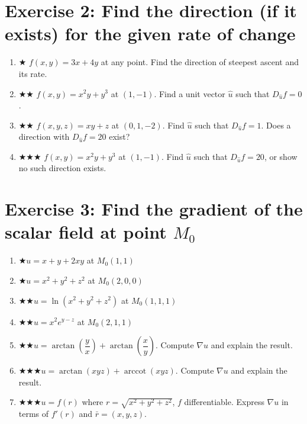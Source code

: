 \documentclass[12pt,a4paper]{article}
\newcommand{\easy}{{\color{green!60!black}$\bigstar$}}
\newcommand{\medium}{{\color{orange}$\bigstar\bigstar$}}
\newcommand{\hard}{{\color{red}$\bigstar\bigstar\bigstar$}}
\begin{document}
\section*{Exercise 2: Find the direction (if it exists) for the given rate of change}

\begin{enumerate}[leftmargin=*, label=(\alph*)]

\item \easy\quad
$f(x,y) = 3x + 4y$ at any point. Find the direction of steepest ascent and its rate.

\item \medium\quad
$f(x,y) = x^2 y + y^3$ at $(1,-1)$.
Find a unit vector $\hat{u}$ such that $D_{\hat{u}}f = 0$.

\item \medium\quad
$f(x,y,z) = xy+z$ at $(0,1,-2)$.
Find $\hat{u}$ such that $D_{\hat{u}}f = 1$.
Does a direction with $D_{\hat{u}}f = 20$ exist?

\item \hard\quad
$f(x,y) = x^2 y + y^3$ at $(1,-1)$.
Find $\hat{u}$ such that $D_{\hat{u}}f = 20$, or show no such direction exists.

\end{enumerate}

\section*{Exercise 3: Find the gradient of the scalar field at point $M_0$}

\begin{enumerate}[leftmargin=*, label=(\alph*)]
\item \easy\quad $u = x+y+2xy$ at $M_0(1,1)$
\item \easy\quad $u = x^2+y^2+z^2$ at $M_0(2,0,0)$
\item \medium\quad $u = \ln(x^2+y^2+z^2)$ at $M_0(1,1,1)$
\item \medium\quad $u = x^2 e^{y-z}$ at $M_0(2,1,1)$
\item \medium\quad $u = \arctan\!\left(\dfrac{y}{x}\right)+\arctan\!\left(\dfrac{x}{y}\right)$.
Compute $\nabla u$ and explain the result.
\item \hard\quad $u = \arctan(xyz)+\operatorname{arccot}(xyz)$.
Compute $\nabla u$ and explain the result.
\item \hard\quad $u = f(r)$ where $r = \sqrt{x^2+y^2+z^2}$, $f$ differentiable.
Express $\nabla u$ in terms of $f'(r)$ and $\bar{r} = (x,y,z)$.
\end{enumerate}
\end{document}
